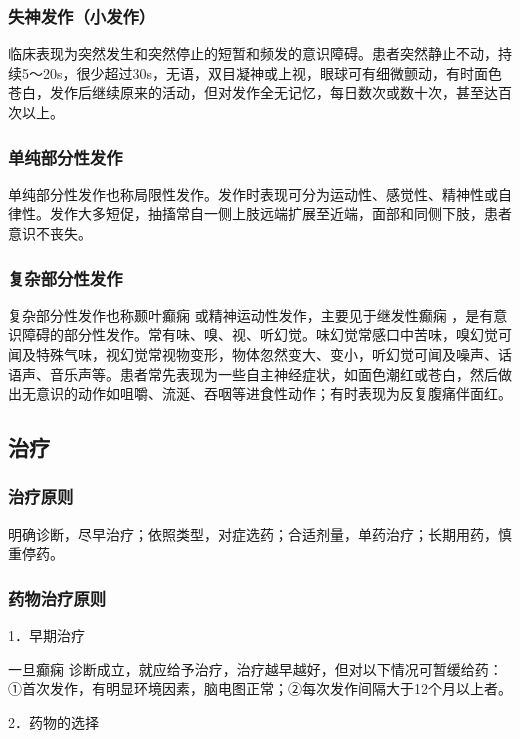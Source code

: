 \subsubsection{失神发作（小发作）}

临床表现为突然发生和突然停止的短暂和频发的意识障碍。患者突然静止不动，持续5～20s，很少超过30s，无语，双目凝神或上视，眼球可有细微颤动，有时面色苍白，发作后继续原来的活动，但对发作全无记忆，每日数次或数十次，甚至达百次以上。

\subsubsection{单纯部分性发作}

单纯部分性发作也称局限性发作。发作时表现可分为运动性、感觉性、精神性或自律性。发作大多短促，抽搐常自一侧上肢远端扩展至近端，面部和同侧下肢，患者意识不丧失。

\subsubsection{复杂部分性发作}

复杂部分性发作也称颞叶癫痫
或精神运动性发作，主要见于继发性癫痫
，是有意识障碍的部分性发作。常有味、嗅、视、听幻觉。味幻觉常感口中苦味，嗅幻觉可闻及特殊气味，视幻觉常视物变形，物体忽然变大、变小，听幻觉可闻及噪声、话语声、音乐声等。患者常先表现为一些自主神经症状，如面色潮红或苍白，然后做出无意识的动作如咀嚼、流涎、吞咽等进食性动作；有时表现为反复腹痛伴面红。

\subsection{治疗}

\subsubsection{治疗原则}

明确诊断，尽早治疗；依照类型，对症选药；合适剂量，单药治疗；长期用药，慎重停药。

\subsubsection{药物治疗原则}

1．早期治疗

一旦癫痫
诊断成立，就应给予治疗，治疗越早越好，但对以下情况可暂缓给药：①首次发作，有明显环境因素，脑电图正常；②每次发作间隔大于12个月以上者。

2．药物的选择

